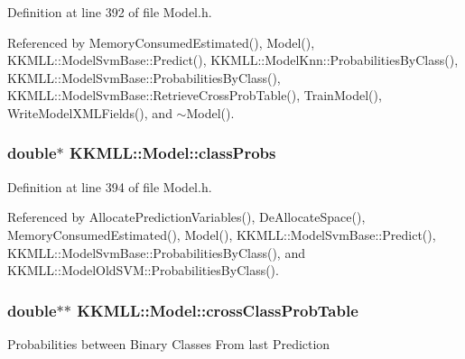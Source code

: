 Definition at line 392 of file Model.\+h.



Referenced by Memory\+Consumed\+Estimated(), Model(), K\+K\+M\+L\+L\+::\+Model\+Svm\+Base\+::\+Predict(), K\+K\+M\+L\+L\+::\+Model\+Knn\+::\+Probabilities\+By\+Class(), K\+K\+M\+L\+L\+::\+Model\+Svm\+Base\+::\+Probabilities\+By\+Class(), K\+K\+M\+L\+L\+::\+Model\+Svm\+Base\+::\+Retrieve\+Cross\+Prob\+Table(), Train\+Model(), Write\+Model\+X\+M\+L\+Fields(), and $\sim$\+Model().

\subsubsection[{\texorpdfstring{class\+Probs}{classProbs}}]{\setlength{\rightskip}{0pt plus 5cm}double$\ast$ K\+K\+M\+L\+L\+::\+Model\+::class\+Probs\hspace{0.3cm}{\ttfamily [protected]}}\hypertarget{class_k_k_m_l_l_1_1_model_a9d51bc464ab7049659aeea120bf9db26}{}\label{class_k_k_m_l_l_1_1_model_a9d51bc464ab7049659aeea120bf9db26}


Definition at line 394 of file Model.\+h.



Referenced by Allocate\+Prediction\+Variables(), De\+Allocate\+Space(), Memory\+Consumed\+Estimated(), Model(), K\+K\+M\+L\+L\+::\+Model\+Svm\+Base\+::\+Predict(), K\+K\+M\+L\+L\+::\+Model\+Svm\+Base\+::\+Probabilities\+By\+Class(), and K\+K\+M\+L\+L\+::\+Model\+Old\+S\+V\+M\+::\+Probabilities\+By\+Class().

\subsubsection[{\texorpdfstring{cross\+Class\+Prob\+Table}{crossClassProbTable}}]{\setlength{\rightskip}{0pt plus 5cm}double$\ast$$\ast$ K\+K\+M\+L\+L\+::\+Model\+::cross\+Class\+Prob\+Table\hspace{0.3cm}{\ttfamily [protected]}}\hypertarget{class_k_k_m_l_l_1_1_model_aa209a1fe3b39f80df9adc87e2f0343d5}{}\label{class_k_k_m_l_l_1_1_model_aa209a1fe3b39f80df9adc87e2f0343d5}
Probabilities between Binary Classes From last Prediction 

